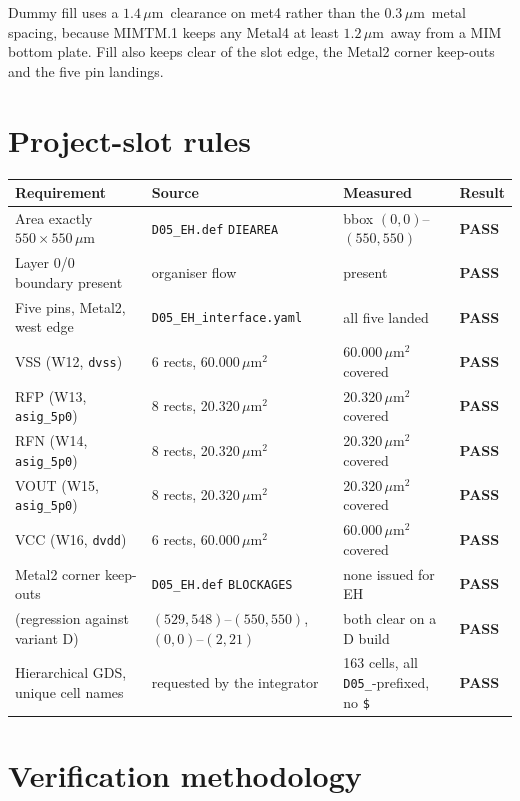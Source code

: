 \documentclass[11pt,a4paper]{article}
\newcommand{\PASS}{\textcolor{green!50!black}{\textbf{PASS}}}
\newcommand{\um}{\,$\mu$m}
\newcommand{\umsq}{\,$\mu$m$^2$}
\begin{document}
Dummy fill uses a $1.4$\um\ clearance on met4 rather than the $0.3$\um\ metal spacing, because
MIMTM.1 keeps any Metal4 at least $1.2$\um\ away from a MIM bottom plate. Fill also keeps clear
of the slot edge, the Metal2 corner keep-outs and the five pin landings.

\section{Project-slot rules}

\begin{longtable}{@{}llll@{}}
\toprule
\textbf{Requirement} & \textbf{Source} & \textbf{Measured} & \textbf{Result} \\
\midrule
\endhead
Area exactly $550\times550$\um & \texttt{D05\_EH.def} \texttt{DIEAREA} & bbox $(0,0)$--$(550,550)$ & \PASS \\
Layer 0/0 boundary present & organiser flow & present & \PASS \\
Five pins, Metal2, west edge & \texttt{D05\_EH\_interface.yaml} & all five landed & \PASS \\
\quad VSS (W12, \texttt{dvss})   & 6 rects, 60.000\umsq & 60.000\umsq covered & \PASS \\
\quad RFP (W13, \texttt{asig\_5p0}) & 8 rects, 20.320\umsq & 20.320\umsq covered & \PASS \\
\quad RFN (W14, \texttt{asig\_5p0}) & 8 rects, 20.320\umsq & 20.320\umsq covered & \PASS \\
\quad VOUT (W15, \texttt{asig\_5p0}) & 8 rects, 20.320\umsq & 20.320\umsq covered & \PASS \\
\quad VCC (W16, \texttt{dvdd})   & 6 rects, 60.000\umsq & 60.000\umsq covered & \PASS \\
Metal2 corner keep-outs & \texttt{D05\_EH.def} \texttt{BLOCKAGES} & none issued for EH & \PASS \\
\quad (regression against variant D) & $(529,548)$--$(550,550)$, $(0,0)$--$(2,21)$ & both clear on a D build & \PASS \\
Hierarchical GDS, unique cell names & requested by the integrator & 163 cells, all \texttt{D05\_}-prefixed, no \texttt{\$} & \PASS \\
\bottomrule
\end{longtable}

\section{Verification methodology}
\label{sec:method}
\end{document}
